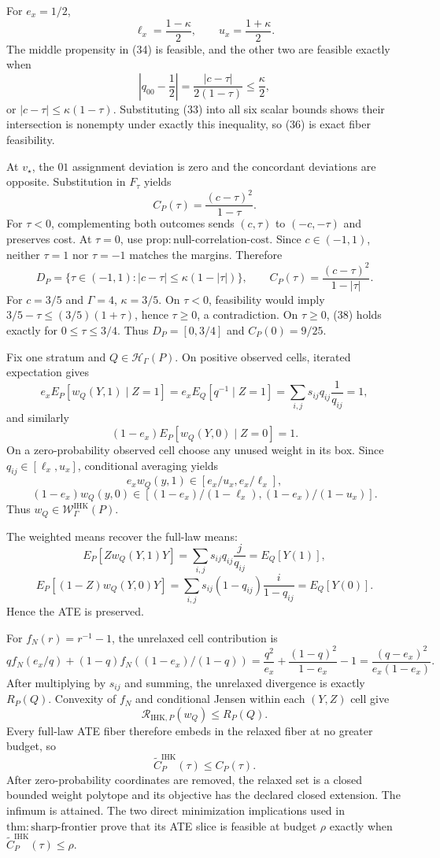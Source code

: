 For \(e_x=1/2\),
\[
\ell_x=\frac{1-\kappa}{2},\qquad u_x=\frac{1+\kappa}{2}. \tag{35}
\]
The middle propensity in (34) is feasible, and the other two are feasible exactly when
\[
\left|q_{00}-\frac12\right|
=\frac{|c-\tau|}{2(1-\tau)}\leq\frac{\kappa}{2}, \tag{36}
\]
or \(|c-\tau|\leq\kappa(1-\tau)\). Substituting (33) into all six scalar bounds shows their intersection is nonempty under exactly this inequality, so (36) is exact fiber feasibility.

At \(v_\star\), the \(01\) assignment deviation is zero and the concordant deviations are opposite. Substitution in \(F_\tau\) yields
\[
C_P(\tau)=\frac{(c-\tau)^2}{1-\tau}. \tag{37}
\]
For \(\tau<0\), complementing both outcomes sends \((c,\tau)\) to \((-c,-\tau)\) and preserves cost. At \(\tau=0\), use \(\mathrm{prop{:}null\mbox{-}correlation\mbox{-}cost}\). Since \(c\in(-1,1)\), neither \(\tau=1\) nor \(\tau=-1\) matches the margins. Therefore
\[
D_P=\{\tau\in(-1,1):|c-\tau|\leq\kappa(1-|\tau|)\},\qquad
C_P(\tau)=\frac{(c-\tau)^2}{1-|\tau|}. \tag{38}
\]
For \(c=3/5\) and \(\Gamma=4\), \(\kappa=3/5\). On \(\tau<0\), feasibility would imply \(3/5-\tau\leq(3/5)(1+\tau)\), hence \(\tau\geq0\), a contradiction. On \(\tau\geq0\), (38) holds exactly for \(0\leq\tau\leq3/4\). Thus \(D_P=[0,3/4]\) and \(C_P(0)=9/25\).

Fix one stratum and \(Q\in\mathcal H_\Gamma(P)\). On positive observed cells, iterated expectation gives
\[
e_xE_P[w_Q(Y,1)\mid Z=1]
=e_xE_Q[q^{-1}\mid Z=1]
=\sum_{i,j}s_{ij}q_{ij}\frac1{q_{ij}}=1, \tag{39}
\]
and similarly
\[
(1-e_x)E_P[w_Q(Y,0)\mid Z=0]=1. \tag{40}
\]
On a zero-probability observed cell choose any unused weight in its box. Since \(q_{ij}\in[\ell_x,u_x]\), conditional averaging yields
\[
e_xw_Q(y,1)\in[e_x/u_x,e_x/\ell_x], \tag{41}
\]
\[
(1-e_x)w_Q(y,0)\in[(1-e_x)/(1-\ell_x),(1-e_x)/(1-u_x)]. \tag{42}
\]
Thus \(w_Q\in\mathcal W^{\mathrm{IHK}}_\Gamma(P)\).

The weighted means recover the full-law means:
\[
E_P[Zw_Q(Y,1)Y]
=\sum_{i,j}s_{ij}q_{ij}\frac{j}{q_{ij}}=E_Q[Y(1)], \tag{43}
\]
\[
E_P[(1-Z)w_Q(Y,0)Y]
=\sum_{i,j}s_{ij}(1-q_{ij})\frac{i}{1-q_{ij}}=E_Q[Y(0)]. \tag{44}
\]
Hence the ATE is preserved.

For \(f_N(r)=r^{-1}-1\), the unrelaxed cell contribution is
\[
qf_N(e_x/q)+(1-q)f_N((1-e_x)/(1-q))
=\frac{q^2}{e_x}+\frac{(1-q)^2}{1-e_x}-1
=\frac{(q-e_x)^2}{e_x(1-e_x)}. \tag{45}
\]
After multiplying by \(s_{ij}\) and summing, the unrelaxed divergence is exactly \(R_P(Q)\). Convexity of \(f_N\) and conditional Jensen within each \((Y,Z)\) cell give
\[
\mathscr R_{\mathrm{IHK},P}(w_Q)\leq R_P(Q). \tag{46}
\]
Every full-law ATE fiber therefore embeds in the relaxed fiber at no greater budget, so
\[
\widetilde C^{\mathrm{IHK}}_P(\tau)\leq C_P(\tau). \tag{47}
\]
After zero-probability coordinates are removed, the relaxed set is a closed bounded weight polytope and its objective has the declared closed extension. The infimum is attained. The two direct minimization implications used in \(\mathrm{thm{:}sharp\mbox{-}frontier}\) prove that its ATE slice is feasible at budget \(\rho\) exactly when \(\widetilde C^{\mathrm{IHK}}_P(\tau)\leq\rho\).

